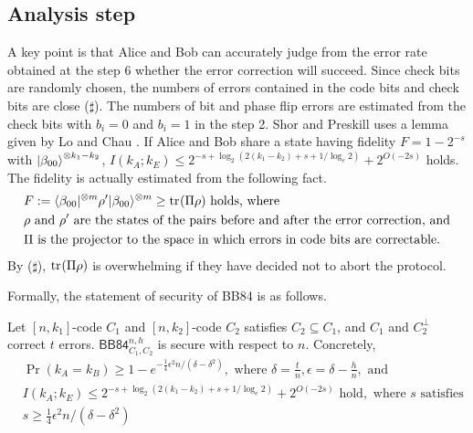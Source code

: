 \subsection{Analysis step}
A key point is that
Alice and Bob can accurately judge
from the error rate obtained at the step 6
whether the error correction will succeed.
Since check bits are randomly chosen, the numbers of
errors contained in the code bits and check bits are close ($\sharp$).
The numbers of bit and phase flip errors are estimated from the check
bits with $b_i = 0$ and $b_i = 1$ in the step 2.
Shor and Preskill uses a lemma given by
Lo and Chau \cite{LoChau1999}. If Alice and Bob share a 
state having fidelity $F = 1 - 2^{-s}$
with ${|\beta_{00}\rangle}^{\otimes {k_1 - k_2}}$, $I(k_A;k_E)
 \le 2^{-s+\log_2(2(k_1 - k_2)+s+1/\log_e 2) } +
 2^{O(-2s)}$ holds. The fidelity is actually estimated from the
following fact.
\begin{align*}
 &F :=  \langle \beta_{00}|^{\otimes m} \rho' |\beta_{00}\rangle^{\otimes m}
 \ge {\rm tr}_{}(\Pi \rho) \mbox{ holds, where}\\
 &\rho \mbox{ and } \rho' \mbox{ are the states of the pairs before 
 and after the error correction, and}\\
 &\Pi \mbox{ is the projector to the space in which 
 errors in code bits are correctable.}
\end{align*}
By ($\sharp$), ${\rm tr}_{}(\Pi \rho)$ is overwhelming if they have decided
not to abort the protocol.

Formally, the statement of security of BB84 is as follows.
\begin{thm}
 Let $[n,k_1]$-code $C_1$ and $[n,k_2]$-code $C_2$ satisfies
 $C_2 \subseteq C_1$, and $C_1$ and $C_2^\perp$ correct $t$ errors.
 $\mathsf{BB84}^{n, h}_{C_1, C_2}$
 is secure with respect to $n$. Concretely, 
 \begin{align*}
 &\Pr(k_A = k_B) \ge 1 - e^{-\frac{1}{4}\epsilon^{2}n / (\delta - 
 \delta^2)}, \mbox{ where }
 \delta = \frac{t}{n},  \epsilon = \delta - \frac{h}{n}, \mbox{ and }\\
 &I(k_A;k_E) \le 2^{-s+\log_2(2(k_1 - k_2)+s+1/\log_e 2) } +
 2^{O(-2s)}\mbox{ hold}, \mbox{ where } s \mbox{ satisfies}\\
 & s \ge \frac{1}{4}\epsilon^{2}n / (\delta - 
 \delta^2)
 \end{align*}
\end{thm}